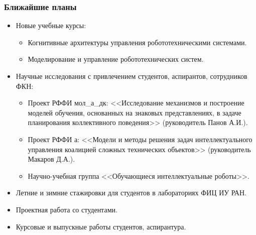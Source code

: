 \documentclass[default]{beamer}
\begin{document}
	\begin{frame}
		\frametitle{Ближайшие планы}
		\small
			\begin{itemize}
				\item Новые учебные курсы:
				\begin{itemize}
					\footnotesize
					\item Когнитивные архитектуры управления робототехническими системами.
					\item Моделирование и управление робототехнических систем.
				\end{itemize}
				\item Научные исследования с привлечением студентов, аспирантов, сотрудников ФКН:
				\begin{itemize}
					\footnotesize
					\item Проект РФФИ мол\_а\_дк: <<Исследование механизмов и построение моделей обучения, основанных на знаковых представлениях, в задаче планирования коллективного поведения>> (руководитель Панов А.И.).
					\item Проект РФФИ а: <<Модели и методы решения задач интеллектуального управления коалицией сложных технических объектов>> (руководитель Макаров Д.А.).
					\item Научно-учебная группа <<Обучающиеся интеллектуальные роботы>>.
				\end{itemize}
				\item Летние и зимние стажировки для студентов в лабораториях ФИЦ ИУ РАН.
				\item Проектная работа со студентами.
				\item Курсовые и выпускные работы студентов, аспирантура.
			\end{itemize}
		
	\end{frame}		
\end{document}
